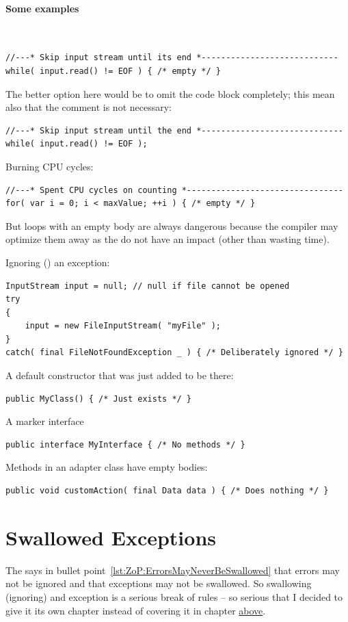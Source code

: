 \paragraph{Some examples}\
\begin{lstlisting}
//---* Skip input stream until its end *----------------------------
while( input.read() != EOF ) { /* empty */ }
\end{lstlisting}
The better option here would be to omit the code block completely; this mean also that the comment is not necessary:
\begin{lstlisting}
//---* Skip input stream until the end *-----------------------------
while( input.read() != EOF );
\end{lstlisting}
Burning CPU cycles:
\begin{lstlisting}
//---* Spent CPU cycles on counting *--------------------------------
for( var i = 0; i < maxValue; ++i ) { /* empty */ }
\end{lstlisting}
But loops with an empty body are always dangerous because the compiler may optimize them away as the do not have an impact (other than wasting time).

Ignoring () an exception:
\begin{lstlisting}
InputStream input = null; // null if file cannot be opened 
try
{
    input = new FileInputStream( "myFile" );
}
catch( final FileNotFoundException _ ) { /* Deliberately ignored */ }
\end{lstlisting}

A default constructor that was just added to be there:
\begin{lstlisting}
public MyClass() { /* Just exists */ }
\end{lstlisting}

A marker interface
\begin{lstlisting}
public interface MyInterface { /* No methods */ }
\end{lstlisting}

Methods in an adapter class have empty bodies:
\begin{lstlisting}
public void customAction( final Data data ) { /* Does nothing */ }
\end{lstlisting}


\section{Swallowed Exceptions}
The \ngref{} says in bullet point~\ref{lst:ZoP:ErrorsMayNeverBeSwallowed} that errors may not be ignored and that exceptions may not be swallowed. So swallowing (ignoring) and exception is a serious break of rules – so serious that I decided to give it its own chapter instead of covering it in chapter  \hyperref[sec:CommentsForBrokenRules]{above}.

